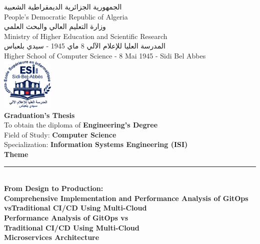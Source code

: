 \thispagestyle{empty}

\begin{center}

{\footnotesize \textarabic{الجمهورية الجزائرية الديمقراطية الشعبية}} \\[0.05cm]
{\footnotesize People's Democratic Republic of Algeria} \\[0.1cm]

{\footnotesize \textarabic{وزارة التعليم العالي والبحث العلمي}} \\[0.05cm]
{\footnotesize Ministry of Higher Education and Scientific Research} \\[0.1cm]

{\footnotesize \textarabic{المدرسة العليا للإعلام الآلي 8 ماي 1945 - سيدي بلعباس}} \\[0.05cm]
{\footnotesize Higher School of Computer Science - 8 Mai 1945 - Sidi Bel Abbes} \\[0.2cm]

\includegraphics[width=2.5cm]{figures/logos/esi-sba-logo.png} \\[0.15cm]

{\Large \textbf{Graduation's Thesis}} \\[0.3cm]

{\small To obtain the diploma of \textbf{Engineering's Degree}} \\[0.1cm]
{\small Field of Study: \textbf{Computer Science}} \\[0.1cm]
{\small Specialization: \textbf{Information Systems Engineering (ISI)}} \\[0.4cm]

{\large \textbf{Theme}} \\[0.2cm]
\rule{13cm}{0.5pt} \\[0.3cm]

{\LARGE \textbf{From Design to Production:}} \\[0.3cm]
{\LARGE \textbf{Comprehensive Implementation and Performance Analysis of GitOps vsTraditional CI/CD Using Multi-Cloud}} \\[0.3cm]
{\LARGE \textbf{Performance Analysis of GitOps vs}} \\[0.3cm]
{\LARGE \textbf{Traditional CI/CD Using Multi-Cloud}} \\[0.3cm]
{\LARGE \textbf{Microservices Architecture}} \\[0.5cm]


\end{center}
